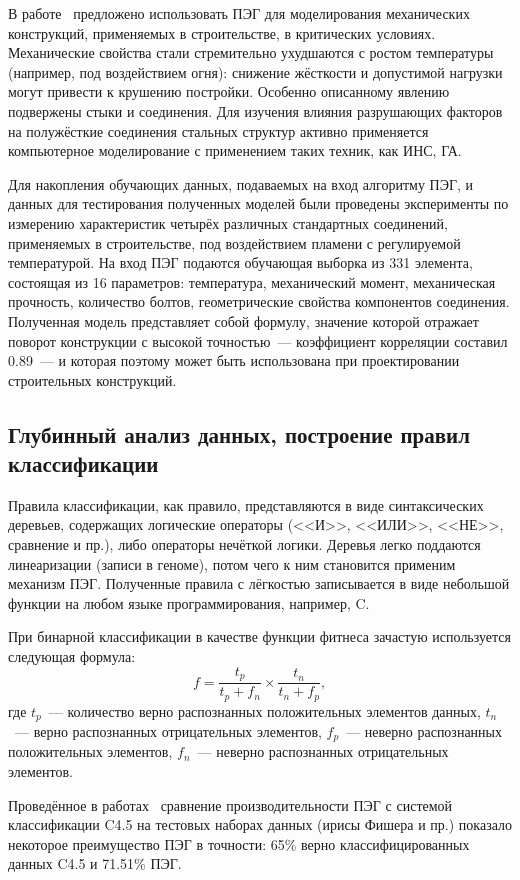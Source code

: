 В работе~\cite{al2010new} предложено использовать ПЭГ для моделирования механических конструкций, применяемых в строительстве, в критических условиях. Механические свойства стали стремительно ухудшаются с ростом температуры (например, под воздействием огня): снижение жёсткости и допустимой нагрузки могут привести к крушению постройки. Особенно описанному явлению подвержены стыки и соединения. Для изучения влияния разрушающих факторов на полужёсткие соединения стальных структур активно применяется компьютерное моделирование с применением таких техник, как ИНС, ГА.

Для накопления обучающих данных, подаваемых на вход алгоритму ПЭГ, и данных для тестирования полученных моделей были проведены эксперименты по измерению характеристик четырёх различных стандартных соединений, применяемых в строительстве, под воздействием пламени с регулируемой температурой. На вход ПЭГ подаются обучающая выборка из 331 элемента, состоящая из 16 параметров: температура, механический момент, механическая прочность, количество болтов, геометрические свойства компонентов соединения.
Полученная модель представляет собой формулу, значение которой отражает поворот конструкции с высокой точностью~--- коэффициент корреляции составил 0.89~--- и которая поэтому может быть использована при проектировании строительных конструкций.


\subsection{Глубинный анализ данных, построение правил классификации}

Правила классификации, как правило, представляются в виде синтаксических деревьев, содержащих логические операторы (<<И>>, <<ИЛИ>>, <<НЕ>>, сравнение и пр.), либо операторы нечёткой логики. Деревья легко поддаются линеаризации (записи в геноме), потом чего к ним становится применим механизм ПЭГ. Полученные правила с лёгкостью записывается в виде небольшой функции на любом языке программирования, например, C.

При бинарной классификации в качестве функции фитнеса зачастую используется следующая формула:
$$
f = \frac{t_p}{t_p+f_n} \times \frac{t_n}{t_n+f_p},
$$
где $t_p$~--- количество верно распознанных положительных элементов данных, $t_n$~--- верно распознанных отрицательных элементов, $f_p$~--- неверно распознанных положительных элементов, $f_n$~--- неверно распознанных отрицательных элементов.

Проведённое в работах~\cite{P1120535113, P1120535114} сравнение производительности ПЭГ с системой классификации {C4.5} на тестовых наборах данных (ирисы Фишера и пр.) показало некоторое преимущество ПЭГ в точности: 65\% верно классифицированных данных {C4.5} и 71.51\% ПЭГ.

